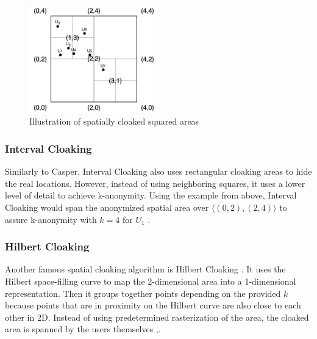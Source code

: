\begin{figure}[htpb]
  \centering
  \includegraphics[width=0.5\textwidth]{figures/casper.png}
  \caption{Illustration of spatially cloaked squared areas} 
  \label{fig:casper}
\end{figure}

\subsubsection{Interval Cloaking}
Similarly to Casper, Interval Cloaking also uses rectangular cloaking areas to hide the real locations. However, instead of using neighboring squares, it uses a lower level of detail to achieve k-anonymity. Using the example from above, Interval Cloaking would span the anonymized spatial area over \(\langle(0,2),(2,4)\rangle\) to assure k-anonymity with \(k=4\) for \(U_1\) \cite{DBLP:conf/ssd/TanLM09}\cite{DBLP:conf/pet/ChengZBP06}.

\subsubsection{Hilbert Cloaking}
Another famous spatial cloaking algorithm is Hilbert Cloaking \cite{DBLP:conf/socialcom/UmKC10}. It uses the Hilbert space-filling curve to map the 2-dimensional area into a 1-dimensional representation. Then it groups together points depending on the provided \(k\) because points that are in proximity on the Hilbert curve are also close to each other in 2D. Instead of using predetermined rasterization of the area, the cloaked area is spanned by the users themselves \cite{DBLP:journals/is/GhinitaZPK10}\cite{DBLP:journals/sigkdd/Gkoulalas-DivanisKV10},\cite{DBLP:conf/ssd/TanLM09}.
